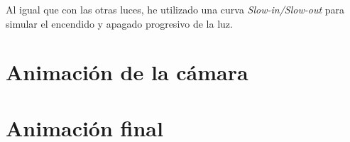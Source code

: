 \documentclass{article}
\begin{document}
Al igual que con las otras luces, he utilizado una curva \textit{Slow-in/Slow-out} para simular el encendido y apagado progresivo de la luz.

\section{Animación de la cámara}

\section{Animación final}
\end{document}
